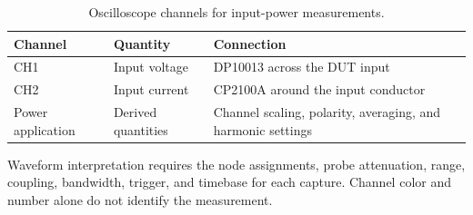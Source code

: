 \begin{table}[htbp]
\centering
\caption{Oscilloscope channels for input-power measurements.}
\label{tab:power-analysis-channel-definitions}
\begin{tabularx}{\textwidth}{@{}p{}p{}X@{}}
\toprule
Channel & Quantity & Connection\\
\midrule
CH1 & Input voltage & DP10013 across the DUT input\\
CH2 & Input current & CP2100A around the input conductor\\
Power application & Derived quantities & Channel scaling, polarity, averaging, and harmonic settings\\
\bottomrule
\end{tabularx}
\end{table}

Waveform interpretation requires the node assignments, probe attenuation,
range, coupling, bandwidth, trigger, and timebase for each capture. Channel
color and number alone do not identify the measurement.
